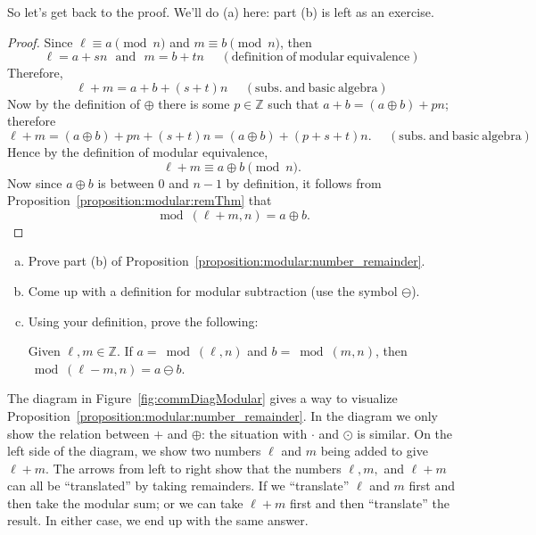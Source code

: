\noindent
So let's get back to the proof.  We'll do (a) here: part (b) is left as an exercise.

\begin{proof}
Since $\ell \equiv a \pmod{n}$ and $m \equiv b \pmod{n}$, then
\[ \ell = a + sn \mathrm{~~~and~~~} m = b + tn  \mathrm{~~~~~~(definition~of~modular~equivalence)} \]
Therefore, 
\[ \ell + m =a + b + (s + t)n \mathrm{~~~~~~(subs.~and~ basic~algebra)} \]
Now by the definition of $\oplus$ there is some $p \in {\mathbb Z}$ such that  $a + b = (a \oplus b) + pn$; therefore 
\[ \ell + m = (a \oplus b) + pn + (s + t)n = (a \oplus b) + ( p + s + t)n. \mathrm{~~~~~~(subs.~and~ basic~algebra)} \]
Hence by the definition of modular equivalence, 
\[ \ell + m \equiv a \oplus b \pmod{n}. \]
Now since $a \oplus b$ is between $0$ and $n-1$ by definition, it follows from Proposition~\ref{proposition:modular:remThm} that
\[ \bmod(\ell + m,n)= a \oplus b. \]
\end{proof}

\begin{exercise}{44}
\begin{enumerate}[(a)]
\item
Prove part (b) of Proposition~\ref{proposition:modular:number_remainder}.
\item
Come up with a definition for modular subtraction (use the symbol $\ominus$).
\item
Using your definition, prove the following:

\noindent
Given $\ell,m \in {\mathbb Z}$. If $a =\bmod(\ell,n)$ and $b=\bmod(m,n)$, then  $\bmod(\ell - m,n) = a\ominus b $.
\end{enumerate}
\end{exercise}

The diagram in Figure~\ref{fig:commDiagModular} gives a way to visualize  Proposition~\ref{proposition:modular:number_remainder}.  In the diagram we only show the relation between $+$ and $\oplus$: the situation with $\cdot$ and $\odot$ is similar. On the left side of the diagram, we show two numbers $\ell$ and $m$ being added to give $\ell + m$. The arrows from left to right show that the numbers $\ell, m,$ and $\ell + m$ can all be ``translated'' by taking remainders. If we ``translate'' $\ell$ and $m$ first and then take the modular sum; or we can take $\ell + m$ first and then ``translate'' the result. In either case, we end up with the same answer.


